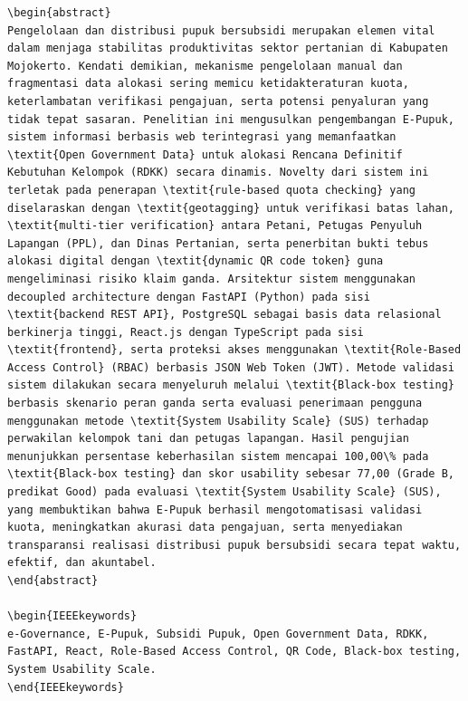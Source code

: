 \documentclass[conference]{IEEEtran}
\begin{document}
\begin{lstlisting}
\begin{abstract}
Pengelolaan dan distribusi pupuk bersubsidi merupakan elemen vital dalam menjaga stabilitas produktivitas sektor pertanian di Kabupaten Mojokerto. Kendati demikian, mekanisme pengelolaan manual dan fragmentasi data alokasi sering memicu ketidakteraturan kuota, keterlambatan verifikasi pengajuan, serta potensi penyaluran yang tidak tepat sasaran. Penelitian ini mengusulkan pengembangan E-Pupuk, sistem informasi berbasis web terintegrasi yang memanfaatkan \textit{Open Government Data} untuk alokasi Rencana Definitif Kebutuhan Kelompok (RDKK) secara dinamis. Novelty dari sistem ini terletak pada penerapan \textit{rule-based quota checking} yang diselaraskan dengan \textit{geotagging} untuk verifikasi batas lahan, \textit{multi-tier verification} antara Petani, Petugas Penyuluh Lapangan (PPL), dan Dinas Pertanian, serta penerbitan bukti tebus alokasi digital dengan \textit{dynamic QR code token} guna mengeliminasi risiko klaim ganda. Arsitektur sistem menggunakan decoupled architecture dengan FastAPI (Python) pada sisi \textit{backend REST API}, PostgreSQL sebagai basis data relasional berkinerja tinggi, React.js dengan TypeScript pada sisi \textit{frontend}, serta proteksi akses menggunakan \textit{Role-Based Access Control} (RBAC) berbasis JSON Web Token (JWT). Metode validasi sistem dilakukan secara menyeluruh melalui \textit{Black-box testing} berbasis skenario peran ganda serta evaluasi penerimaan pengguna menggunakan metode \textit{System Usability Scale} (SUS) terhadap perwakilan kelompok tani dan petugas lapangan. Hasil pengujian menunjukkan persentase keberhasilan sistem mencapai 100,00\% pada \textit{Black-box testing} dan skor usability sebesar 77,00 (Grade B, predikat Good) pada evaluasi \textit{System Usability Scale} (SUS), yang membuktikan bahwa E-Pupuk berhasil mengotomatisasi validasi kuota, meningkatkan akurasi data pengajuan, serta menyediakan transparansi realisasi distribusi pupuk bersubsidi secara tepat waktu, efektif, dan akuntabel.
\end{abstract}

\begin{IEEEkeywords}
e-Governance, E-Pupuk, Subsidi Pupuk, Open Government Data, RDKK, FastAPI, React, Role-Based Access Control, QR Code, Black-box testing, System Usability Scale.
\end{IEEEkeywords}


\end{lstlisting}
\end{document}
